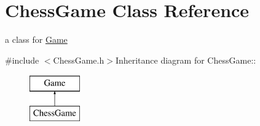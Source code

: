 \hypertarget{classChessGame}{
\section{ChessGame Class Reference}
\label{classChessGame}
}


a class for \hyperlink{classGame}{Game}  


{\ttfamily \#include $<$ChessGame.h$>$}Inheritance diagram for ChessGame::\begin{figure}[H]
\begin{center}
\leavevmode
\includegraphics[height=2cm]{classChessGame}
\end{center}
\end{figure}
